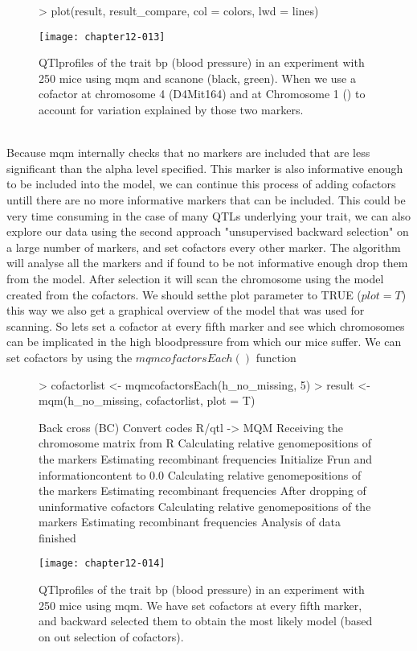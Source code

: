 \documentclass[11pt]{article}
\begin{document}
\begin{figure}[h]
\begin{Schunk}
\begin{Sinput}
> plot(result, result_compare, col = colors, lwd = lines)
\end{Sinput}
\end{Schunk}
\texttt{[image: chapter12-013]}
\caption{QTlprofiles of the trait bp (blood pressure) in an experiment with 250 mice using mqm and scanone (black, green). When we use a cofactor at chromosome 4 (D4Mit164) and at Chromosome 1 () to account for variation explained by those two markers.}
\end{figure}
\\
Because mqm internally checks that no markers are included that are less significant than the alpha level specified. This marker is also informative enough to be included into the model, we can continue this process of adding
cofactors untill there are no more informative markers that can be included. This could be very time consuming in the case of many QTLs underlying your trait, we can also explore our data using the second approach "unsupervised backward selection" on a large number of markers, and set cofactors every other marker. The algorithm will analyse all the markers and if found to be not informative enough drop them from the model. After selection it will scan the chromosome using the model created from the cofactors. We should setthe plot parameter to TRUE ($plot=T$) this way we also get a graphical overview of the model that was used for scanning. So lets set a cofactor at every fifth marker and see which chromosomes can be implicated in the high bloodpressure from which our mice suffer. We can set cofactors by using the $mqmcofactorsEach()$ function\\
\begin{figure}[h]
\begin{Schunk}
\begin{Sinput}
> cofactorlist <- mqmcofactorsEach(h_no_missing, 5)
> result <- mqm(h_no_missing, cofactorlist, plot = T)
\end{Sinput}
\begin{Soutput}
Back cross (BC)
Convert codes R/qtl -> MQM
Receiving the chromosome matrix from R
Calculating relative genomepositions of the markers
Estimating recombinant frequencies
Initialize Frun and informationcontent to 0.0
Calculating relative genomepositions of the markers
Estimating recombinant frequencies
After dropping of uninformative cofactors
Calculating relative genomepositions of the markers
Estimating recombinant frequencies
Analysis of data finished
\end{Soutput}
\end{Schunk}
\texttt{[image: chapter12-014]}
\caption{QTlprofiles of the trait bp (blood pressure) in an experiment with 250 mice using mqm. We have set cofactors at every fifth marker, and backward selected them to obtain the most likely model (based on out selection of cofactors).
}
\end{figure}
\end{document}

